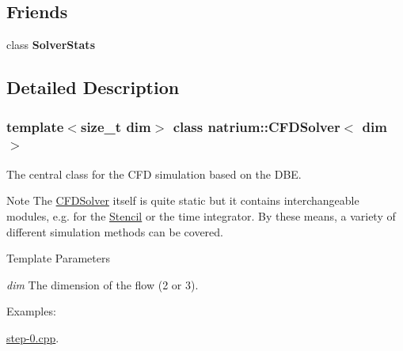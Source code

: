 \subsection*{Friends}
\begin{DoxyCompactItemize}
\item 
\hypertarget{classnatrium_1_1CFDSolver_a077a2603e5a09310a68f71b538415f46}{
class {\bfseries SolverStats}}
\label{classnatrium_1_1CFDSolver_a077a2603e5a09310a68f71b538415f46}

\end{DoxyCompactItemize}


\subsection{Detailed Description}
\subsubsection*{template$<$size\_\-t dim$>$ class natrium::CFDSolver$<$ dim $>$}

The central class for the CFD simulation based on the DBE. \begin{DoxyNote}{Note}
The \hyperlink{classnatrium_1_1CFDSolver}{CFDSolver} itself is quite static but it contains interchangeable modules, e.g. for the \hyperlink{classnatrium_1_1Stencil}{Stencil} or the time integrator. By these means, a variety of different simulation methods can be covered. 
\end{DoxyNote}

\begin{DoxyTemplParams}{Template Parameters}
\item[{\em dim}]The dimension of the flow (2 or 3). \end{DoxyTemplParams}
\begin{Desc}
\item[Examples: ]\par


\hyperlink{step-0_8cpp-example}{step-\/0.cpp}.\end{Desc}


